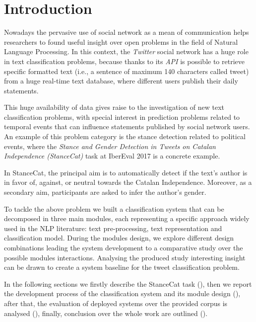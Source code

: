 \section{Introduction} \label{sec:introduction}

Nowadays the pervasive use of social network as a mean of communication helps researchers to found useful insight over open problems in the field of Natural Language Processing. %
In this context, the \emph{Twitter} social network has a huge role in text classification problems, because thanks to its \emph{API} is possible to retrieve specific formatted text (i.e., a sentence of maximum 140 characters called tweet) from a huge real-time text database, where different users publish their daily statements.

This huge availability of data gives raise to the investigation of new text classification problems, with special interest in prediction problems related to temporal events that can influence statements published by social network users. An example of this problem category is the stance detection related to political events, where the  \emph{Stance and Gender Detection in Tweets on Catalan Independence (StanceCat)} task at IberEval 2017 is a concrete example. %

In StanceCat, the principal aim is to automatically detect if the text's author is in favor of, against, or neutral towards the Catalan Independence. Moreover, as a secondary aim, participants are asked to infer the author's gender. 

To tackle the above problem we built a classification system that can be decomposed in three main modules, each representing a specific approach widely used in the NLP literature: text pre-processing, text representation and classification model.
During the modules design, we explore different design combinations leading the system development to a comparative study over the possible modules interactions.
Analysing the produced study interesting insight can be drawn to create a system baseline for the tweet classification problem.

In the following sections we firstly describe the StanceCat task (), then we report the development process of the classification system and its module design (), after that, the evaluation of deployed systems over the provided corpus is analysed (), finally, conclusion over the whole work are outlined ().
